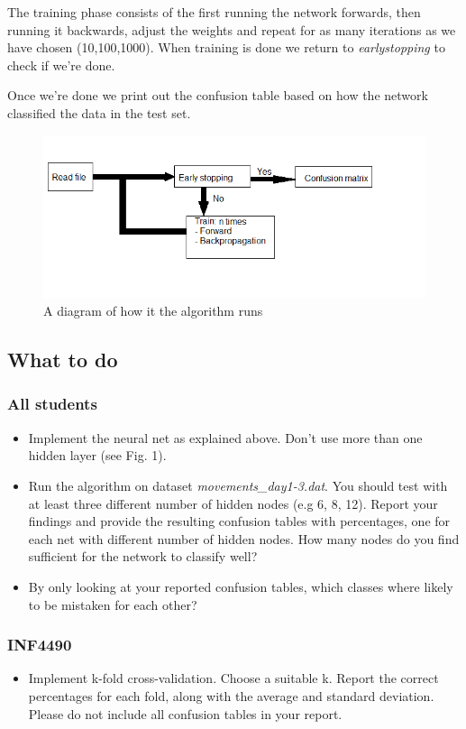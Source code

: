 \documentclass{article}           %
\begin{document}
The training phase consists of the first running the network forwards, then running it backwards, adjust the weights and repeat for as many iterations as we have chosen (10,100,1000). When training is done we return to \emph{earlystopping} to check if we're done.

Once we're done we print out the confusion table based on how the network classified the data in the test set.

\begin{figure}[h]
    \centering
    \includegraphics[scale=0.5]{figures/diagram.png}
    \caption{A diagram of how it the algorithm runs}
    \label{fig:awesome_image}
\end{figure}

\subsection*{What to do}

\subsubsection*{All students}
\begin{itemize}
\item Implement the neural net as explained above. Don't use more than one hidden layer (see Fig. 1).
\item Run the algorithm on dataset \emph{movements\_day1-3.dat}. You should test with at least three different number of hidden nodes (e.g 6, 8, 12). Report your findings and provide the resulting confusion tables with percentages, one for each net with different number of hidden nodes. How many nodes do you find sufficient for the network to classify well?
\item By only looking at your reported confusion tables, which classes where likely to be mistaken for each other?
\end{itemize}

\subsubsection*{INF4490}
\begin{itemize}
\item Implement k-fold cross-validation. Choose a suitable k. Report the correct percentages for each fold, along with the average and standard deviation. Please do not include all confusion tables in your report.
\end{itemize}


\end{document}
